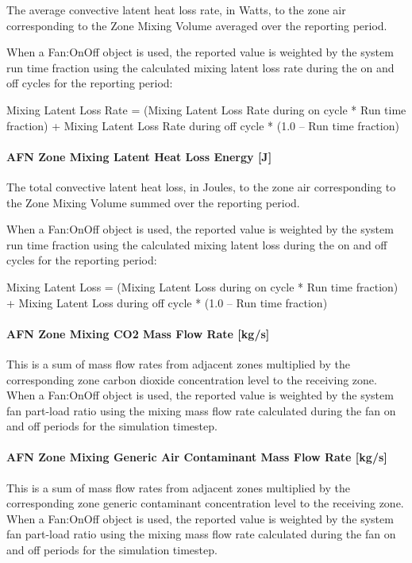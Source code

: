 The average convective latent heat loss rate, in Watts, to the zone air corresponding to the Zone Mixing Volume averaged over the reporting period.

When a Fan:OnOff object is used, the reported value is weighted by the system run time fraction using the calculated mixing latent loss rate during the on and off cycles for the reporting period:

Mixing Latent Loss Rate = (Mixing Latent Loss Rate during on cycle * Run time fraction) + Mixing Latent Loss Rate during off cycle * (1.0 -- Run time fraction)

\paragraph{AFN Zone Mixing Latent Heat Loss Energy {[}J{]}}\label{afn-zone-mixing-latent-heat-loss-energy-j}

The total convective latent heat loss, in Joules, to the zone air corresponding to the Zone Mixing Volume summed over the reporting period.

When a Fan:OnOff object is used, the reported value is weighted by the system run time fraction using the calculated mixing latent loss during the on and off cycles for the reporting period:

Mixing Latent Loss = (Mixing Latent Loss during on cycle * Run time fraction) + Mixing Latent Loss during off cycle * (1.0 -- Run time fraction)

\paragraph{AFN Zone Mixing CO2 Mass Flow Rate {[}kg/s{]}}\label{afn-zone-mixing-co2-mass-flow-rate-kgs}

This is a sum of mass flow rates from adjacent zones multiplied by the corresponding zone carbon dioxide concentration level to the receiving zone. When a Fan:OnOff object is used, the reported value is weighted by the system fan part-load ratio using the mixing mass flow rate calculated during the fan on and off periods for the simulation timestep.

\paragraph{AFN Zone Mixing Generic Air Contaminant Mass Flow Rate {[}kg/s{]}}\label{afn-zone-mixing-generic-air-contaminant-mass-flow-rate-kgs}

This is a sum of mass flow rates from adjacent zones multiplied by the corresponding zone generic contaminant concentration level to the receiving zone. When a Fan:OnOff object is used, the reported value is weighted by the system fan part-load ratio using the mixing mass flow rate calculated during the fan on and off periods for the simulation timestep.

